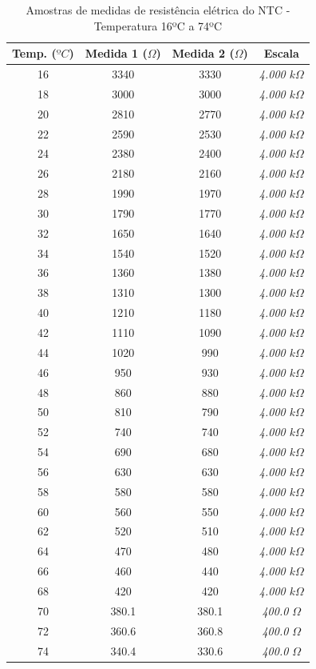 \documentclass[a4paper]{instrumentacao}
\begin{document}
\begin{table}[H]
\centering
\caption{Amostras de medidas de resistência elétrica do NTC - Temperatura 16ºC a 74ºC}
\label{tab:amostras-ntc}
\begin{tabular}{|c|c|c|c|}
\hline
\textbf{Temp. ($ºC$)} & \textbf{Medida 1 ($\Omega$)} & \textbf{Medida 2 ($\Omega$)} & \textbf{Escala} \\ \hline
 16 & 3340 & 3330 & \textit{4.000 $k\Omega$} \\ \hline
 18 & 3000 & 3000 & \textit{4.000 $k\Omega$} \\ \hline
 20 & 2810 & 2770 & \textit{4.000 $k\Omega$} \\ \hline
 22 & 2590 & 2530 & \textit{4.000 $k\Omega$} \\ \hline
 24 & 2380 & 2400 & \textit{4.000 $k\Omega$} \\ \hline
 26 & 2180 & 2160 & \textit{4.000 $k\Omega$} \\ \hline
 28 & 1990 & 1970 & \textit{4.000 $k\Omega$} \\ \hline
 30 & 1790 & 1770 & \textit{4.000 $k\Omega$} \\ \hline
 32 & 1650 & 1640 & \textit{4.000 $k\Omega$} \\ \hline
 34 & 1540 & 1520 & \textit{4.000 $k\Omega$} \\ \hline
 36 & 1360 & 1380 & \textit{4.000 $k\Omega$} \\ \hline
 38 & 1310 & 1300 & \textit{4.000 $k\Omega$} \\ \hline
 40 & 1210 & 1180 & \textit{4.000 $k\Omega$} \\ \hline
 42 & 1110 & 1090 & \textit{4.000 $k\Omega$} \\ \hline
 44 & 1020 & 990 & \textit{4.000 $k\Omega$} \\ \hline
 46 & 950 & 930 & \textit{4.000 $k\Omega$} \\ \hline
 48 & 860 & 880 & \textit{4.000 $k\Omega$} \\ \hline
 50 & 810 & 790 & \textit{4.000 $k\Omega$} \\ \hline
 52 & 740 & 740 & \textit{4.000 $k\Omega$} \\ \hline
 54 & 690 & 680 & \textit{4.000 $k\Omega$} \\ \hline
 56 & 630 & 630 & \textit{4.000 $k\Omega$} \\ \hline
 58 & 580 & 580 & \textit{4.000 $k\Omega$} \\ \hline
 60 & 560 & 550 & \textit{4.000 $k\Omega$} \\ \hline
 62 & 520 & 510 & \textit{4.000 $k\Omega$} \\ \hline
 64 & 470 & 480 & \textit{4.000 $k\Omega$} \\ \hline
 66 & 460 & 440 & \textit{4.000 $k\Omega$} \\ \hline
 68 & 420 & 420 & \textit{4.000 $k\Omega$} \\ \hline
 70 & 380.1 & 380.1 & \textit{400.0 $\Omega$} \\ \hline
 72 & 360.6 & 360.8 & \textit{400.0 $\Omega$} \\ \hline
 74 & 340.4 & 330.6 & \textit{400.0 $\Omega$} \\ \hline
\end{tabular}
\end{table}
\end{document}
